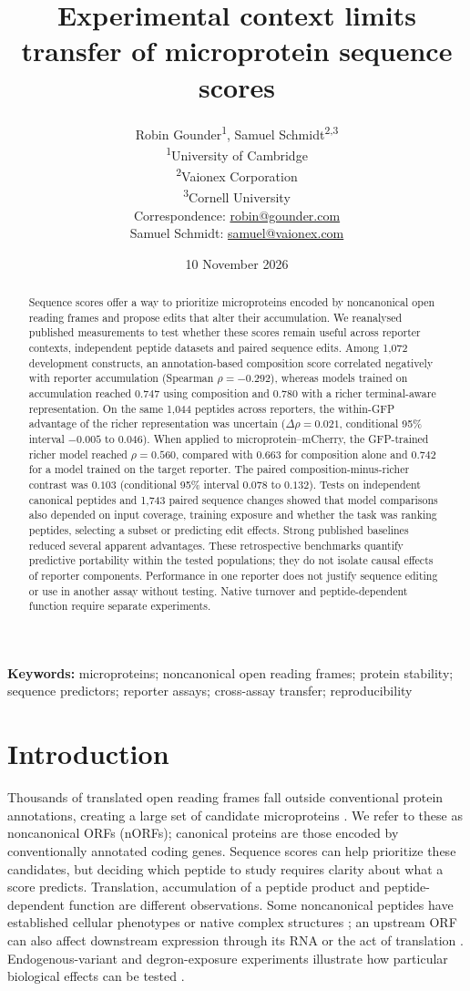 \documentclass[11pt,a4paper]{article}
\title{Experimental context limits transfer of microprotein sequence scores}
\author{Robin Gounder\textsuperscript{1}, Samuel Schmidt\textsuperscript{2,3}\\[4pt]
\small\textsuperscript{1}University of Cambridge\\
\small\textsuperscript{2}Vaionex Corporation\\
\small\textsuperscript{3}Cornell University\\[4pt]
\small Correspondence: \href{mailto:robin@gounder.com}{robin@gounder.com}\\
\small Samuel Schmidt: \href{mailto:samuel@vaionex.com}{samuel@vaionex.com}}
\date{10 November 2026}
\begin{document}
\maketitle

\begin{abstract}
Sequence scores offer a way to prioritize microproteins encoded by
noncanonical open reading frames and propose edits that alter their
accumulation. We reanalysed published measurements to test whether these
scores remain useful across reporter contexts, independent peptide datasets
and paired sequence edits. Among 1,072 development constructs, an
annotation-based composition score correlated negatively with reporter
accumulation (Spearman $\rho=-0.292$), whereas models trained on accumulation
reached $0.747$ using composition and $0.780$ with a richer terminal-aware
representation. On the same 1,044 peptides across reporters, the
within-GFP advantage of the richer representation was uncertain
($\Delta\rho=0.021$, conditional 95\% interval $-0.005$ to $0.046$).
When applied to microprotein--mCherry, the GFP-trained richer model reached
$\rho=0.560$, compared with $0.663$ for composition alone and $0.742$ for a
model trained on the target reporter. The paired composition-minus-richer
contrast was $0.103$ (conditional 95\% interval $0.078$ to $0.132$).
Tests on independent canonical peptides and 1,743 paired sequence changes
showed that model comparisons also depended on input coverage, training
exposure and whether the task was ranking peptides, selecting a subset or
predicting edit effects. Strong published baselines reduced several apparent
advantages. These retrospective benchmarks quantify predictive portability
within the tested populations; they do not isolate causal effects of reporter
components. Performance in one reporter does not justify sequence editing or
use in another assay without testing. Native turnover and peptide-dependent
function require separate experiments.
\end{abstract}
\noindent\textbf{Keywords:} microproteins; noncanonical open reading frames; protein stability; sequence predictors; reporter assays; cross-assay transfer; reproducibility
\clearpage
\section{Introduction}
Thousands of translated open reading frames fall outside conventional
protein annotations, creating a large set of candidate microproteins
\cite{mudge,chothani}. We refer to these as noncanonical ORFs (nORFs);
canonical proteins are those encoded by conventionally annotated coding
genes. Sequence scores can help prioritize these candidates,
but deciding which peptide to study requires clarity about what a score
predicts. Translation, accumulation of a peptide product and
peptide-dependent function are different observations. Some noncanonical
peptides have established cellular phenotypes or native complex structures
\cite{samandi,brownmitoribosome,rathoremief}; an upstream ORF can also affect
downstream expression through its RNA or the act of translation
\cite{shepelev}. Endogenous-variant and degron-exposure experiments illustrate
how particular biological effects can be tested \cite{ghosh,hasenjaeger}.
\end{document}
